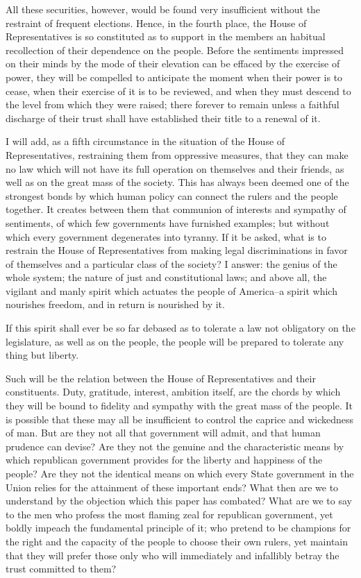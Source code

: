 All these securities, however, would be found very insufficient without the restraint of frequent elections. 
Hence, in the fourth place, the House of Representatives is so constituted as to support in the members an habitual recollection of their dependence on the people. 
Before the sentiments impressed on their minds by the mode of their elevation can be effaced by the exercise of power, they will be compelled to anticipate the moment when their power is to cease, when their exercise of it is to be reviewed, and when they must descend to the level from which they were raised; there forever to remain unless a faithful discharge of their trust shall have established their title to a renewal of it.

I will add, as a fifth circumstance in the situation of the House of Representatives, restraining them from oppressive measures, that they can make no law which will not have its full operation on themselves and their friends, as well as on the great mass of the society. 
This has always been deemed one of the strongest bonds by which human policy can connect the rulers and the people together. 
It creates between them that communion of interests and sympathy of sentiments, of which few governments have furnished examples; but without which every government degenerates into tyranny. 
If it be asked, what is to restrain the House of Representatives from making legal discriminations in favor of themselves and a particular class of the society? 
I answer: the genius of the whole system; the nature of just and constitutional laws; and above all, the vigilant and manly spirit which actuates the people of America--a spirit which nourishes freedom, and in return is nourished by it.

If this spirit shall ever be so far debased as to tolerate a law not obligatory on the legislature, as well as on the people, the people will be prepared to tolerate any thing but liberty.

Such will be the relation between the House of Representatives and their constituents. 
Duty, gratitude, interest, ambition itself, are the chords by which they will be bound to fidelity and sympathy with the great mass of the people. 
It is possible that these may all be insufficient to control the caprice and wickedness of man. 
But are they not all that government will admit, and that human prudence can devise? 
Are they not the genuine and the characteristic means by which republican government provides for the liberty and happiness of the people? 
Are they not the identical means on which every State government in the Union relies for the attainment of these important ends? 
What then are we to understand by the objection which this paper has combated? 
What are we to say to the men who profess the most flaming zeal for republican government, yet boldly impeach the fundamental principle of it; who pretend to be champions for the right and the capacity of the people to choose their own rulers, yet maintain that they will prefer those only who will immediately and infallibly betray the trust committed to them?

